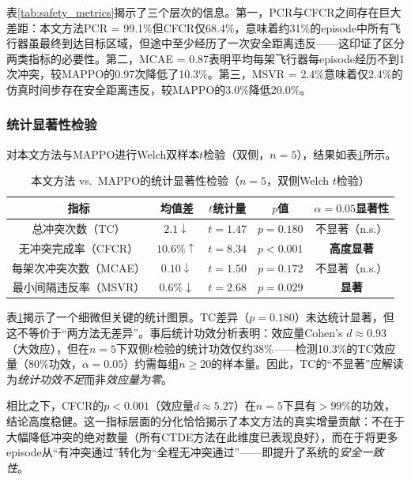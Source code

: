 \documentclass[12pt,a4paper,UTF8]{ctexart}
\begin{document}
表\ref{tab:safety_metrics}揭示了三个层次的信息。第一，PCR与CFCR之间存在巨大差距：本文方法PCR = 99.1\%但CFCR仅68.4\%，意味着约31\%的episode中所有飞行器虽最终到达目标区域，但途中至少经历了一次安全距离违反——这印证了区分两类指标的必要性。第二，MCAE = 0.87表明平均每架飞行器每episode经历不到1次冲突，较MAPPO的0.97次降低了10.3\%。第三，MSVR = 2.4\%意味着仅2.4\%的仿真时间步存在安全距离违反，较MAPPO的3.0\%降低20.0\%。

\subsubsection{统计显著性检验}

对本文方法与MAPPO进行Welch双样本$t$检验（双侧，$n=5$），结果如表\ref{tab:statistical_tests}所示。

\begin{table}[H]
    \centering
    \caption{本文方法 vs.\ MAPPO的统计显著性检验（$n=5$，双侧Welch $t$检验）}
    \label{tab:statistical_tests}
    \begin{tabular}{|c|c|c|c|c|}
        \hline
        \textbf{指标} & \textbf{均值差} & \textbf{$t$统计量} & \textbf{$p$值} & \textbf{$\alpha=0.05$显著性} \\
        \hline
        总冲突次数（TC） & $2.1 \downarrow$ & $t=1.47$ & $p=0.180$ & 不显著（n.s.） \\
        \hline
        无冲突完成率（CFCR） & $10.6\% \uparrow$ & $t=8.34$ & $p<0.001$ & \textbf{高度显著} \\
        \hline
        每架次冲突次数（MCAE） & $0.10 \downarrow$ & $t=1.50$ & $p=0.172$ & 不显著（n.s.） \\
        \hline
        最小间隔违反率（MSVR） & $0.6\% \downarrow$ & $t=2.68$ & $p=0.029$ & \textbf{显著} \\
        \hline
    \end{tabular}
\end{table}

表\ref{tab:statistical_tests}揭示了一个细微但关键的统计图景。TC差异（$p=0.180$）未达统计显著，但这不等价于``两方法无差异''。事后统计功效分析表明：效应量Cohen's $d \approx 0.93$（大效应），但在$n=5$下双侧$t$检验的统计功效仅约38\%——检测10.3\%的TC效应量（80\%功效，$\alpha=0.05$）约需每组$n \geq 20$的样本量。因此，TC的``不显著''应解读为\emph{统计功效不足}而非\emph{效应量为零}。

相比之下，CFCR的$p<0.001$（效应量$d \approx 5.27$）在$n=5$下具有$>99\%$的功效，结论高度稳健。这一指标层面的分化恰恰揭示了本文方法的真实增量贡献：不在于大幅降低冲突的绝对数量（所有CTDE方法在此维度已表现良好），而在于将更多episode从``有冲突通过''转化为``全程无冲突通过''——即提升了系统的\emph{安全一致性}。
\end{document}
